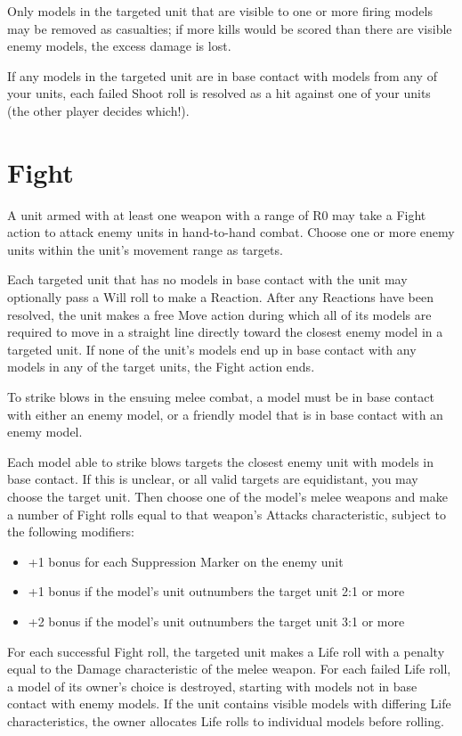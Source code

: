 \begin{multicols}{2}
Only models in the targeted unit that are visible to one or more firing models may be removed as casualties; if more kills would be scored than there are visible enemy models, the excess damage is lost.

If any models in the targeted unit are in base contact with models from any of your units, each failed Shoot roll is resolved as a hit against one of your units (the other player decides which!).




\section*{Fight}
A unit armed with at least one weapon with a range of R0 may take a Fight action to attack enemy units in hand-to-hand combat. Choose one or more enemy units within the unit's movement range as targets.

Each targeted unit that has no models in base contact with the unit may optionally pass a Will roll to make a Reaction. After any Reactions have been resolved, the unit makes a free Move action during which all of its models are required to move in a straight line directly toward the closest enemy model in a targeted unit. If none of the unit's models end up in base contact with any models in any of the target units, the Fight action ends.

To strike blows in the ensuing melee combat, a model must be in base contact with either an enemy model, or a friendly model that is in base contact with an enemy model.

Each model able to strike blows targets the closest enemy unit with models in base contact. If this is unclear, or all valid targets are equidistant, you may choose the target unit. Then choose one of the model's melee weapons and make a number of Fight rolls equal to that weapon's Attacks characteristic, subject to the following modifiers:

\begin{itemize}
 \item +1 bonus for each Suppression Marker on the enemy unit
 \item +1 bonus if the model's unit outnumbers the target unit 2:1 or more
 \item +2 bonus if the model's unit outnumbers the target unit 3:1 or more
\end{itemize}

For each successful Fight roll, the targeted unit makes a Life roll with a penalty equal to the Damage characteristic of the melee weapon. For each failed Life roll, a model of its owner's choice is destroyed, starting with models not in base contact with enemy models. If the unit contains visible models with differing Life characteristics, the owner allocates Life rolls to individual models before rolling.





\end{multicols}
